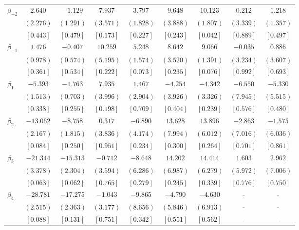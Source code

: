 \documentclass[12pt]{article}
\begin{document}
\begin{table}[h!]
\begin{adjustbox}{scale=0.7}
\begin{tabular}{lcccccccc}
$\beta_{-2}$ & $  2.640$ & $ -1.129$ & $  7.937$ & $  3.797$ & $  9.648$ & $ 10.123$ & $  0.212$ & $  1.218$ \\
& $(  2.276)$ & $(  1.291)$ & $(  3.571)$ & $(  1.828)$ & $(  3.888)$ & $(  1.807)$ & $(  3.339)$ & $(  1.357)$ \\
& $[  0.443]$ & $[  0.479]$ & $[  0.173]$ & $[  0.227]$ & $[  0.243]$ & $[  0.042]$ & $[  0.889]$ & $[  0.497]$ \\
$\beta_{-1}$ & $  1.476$ & $ -0.407$ & $ 10.259$ & $  5.248$ & $  8.642$ & $  9.066$ & $ -0.035$ & $  0.886$ \\
& $(  0.978)$ & $(  0.574)$ & $(  5.195)$ & $(  1.574)$ & $(  3.520)$ & $(  1.391)$ & $(  3.234)$ & $(  3.607)$ \\
& $[  0.361]$ & $[  0.534]$ & $[  0.222]$ & $[  0.073]$ & $[  0.235]$ & $[  0.076]$ & $[  0.992]$ & $[  0.693]$ \\
$\beta_{1}$ & $ -5.393$ & $ -1.763$ & $  7.935$ & $  1.467$ & $ -4.254$ & $ -4.342$ & $ -6.550$ & $ -5.330$ \\
& $(  1.513)$ & $(  0.703)$ & $(  3.996)$ & $(  2.904)$ & $(  3.926)$ & $(  3.326)$ & $(  7.945)$ & $(  5.515)$ \\
& $[  0.338]$ & $[  0.255]$ & $[  0.198]$ & $[  0.709]$ & $[  0.404]$ & $[  0.239]$ & $[  0.576]$ & $[  0.480]$ \\
$\beta_{2}$ & $-13.062$ & $ -8.758$ & $  0.317$ & $ -6.890$ & $ 13.628$ & $ 13.896$ & $ -2.863$ & $ -1.575$ \\
& $(  2.167)$ & $(  1.815)$ & $(  3.836)$ & $(  4.174)$ & $(  7.994)$ & $(  6.012)$ & $(  7.016)$ & $(  6.036)$ \\
& $[  0.084]$ & $[  0.250]$ & $[  0.951]$ & $[  0.234]$ & $[  0.300]$ & $[  0.264]$ & $[  0.701]$ & $[  0.861]$ \\
$\beta_{3}$ & $-21.344$ & $-15.313$ & $ -0.712$ & $ -8.648$ & $ 14.202$ & $ 14.414$ & $  1.603$ & $  2.962$ \\
& $(  3.378)$ & $(  2.304)$ & $(  3.594)$ & $(  6.286)$ & $(  6.987)$ & $(  6.279)$ & $(  5.972)$ & $(  7.006)$ \\
& $[  0.063]$ & $[  0.062]$ & $[  0.765]$ & $[  0.279]$ & $[  0.245]$ & $[  0.339]$ & $[  0.776]$ & $[  0.750]$ \\
$\beta_{4}$ & $-28.781$ & $-17.275$ & $ -1.043$ & $ -9.865$ & $ -4.790$ & $ -4.630$ & - & - \\
& $(  2.515)$ & $(  2.363)$ & $(  3.177)$ & $(  8.656)$ & $(  5.846)$ & $(  6.913)$ & - & - \\
& $[  0.088]$ & $[  0.131]$ & $[  0.751]$ & $[  0.342]$ & $[  0.551]$ & $[  0.562]$ & - & - \\

\end{tabular}
\end{adjustbox}
\end{table}
\end{document}
